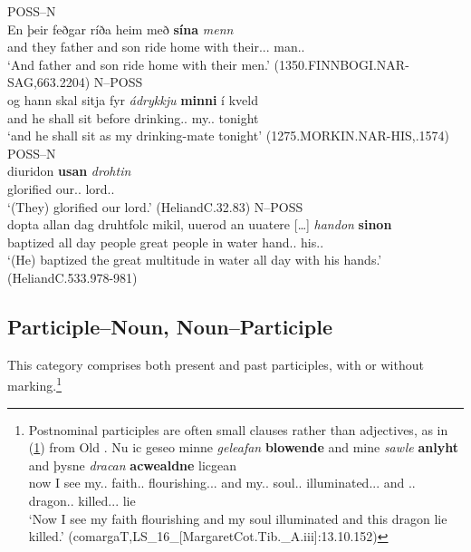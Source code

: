\documentclass[output=paper,colorlinks,citecolor=brown,draft]{langscibook}
\begin{document}
\ea\label{OIPossN}
\noindent {}
\ea
POSS--N\\
\gll En þeir feðgar ríða heim með \textbf{sína} \textit{menn}\\
	and they {father and son} ride home with their.\REFL.\ACC.\PL{} man.\ACC.\PL{}\\
\glt	‘And father and son ride home with their men.’
(1350.FINNBOGI.NAR-SAG,663.2204)
\ex\label{OINPoss}
N--POSS\\
\gll og hann skal sitja fyr \textit{ádrykkju} \textbf{minni} {í kveld}\\
	and he shall sit before drinking.\DAT.\SG{} my.\DAT.\SG{} tonight\\
\glt `and he shall sit as my drinking-mate tonight’ (1275.MORKIN.NAR-HIS,.1574)
\z
\ex\label{OSPossN}
\noindent {}
\ea POSS--N\\
\gll diuridon \textbf{usan} \textit{drohtin}\\
	glorified our.\ACC.\SG{} lord.\ACC.\SG{}\\
\glt ‘(They) glorified our lord.’ (HeliandC.32.83)
\ex\label{OSNPoss}
N--POSS\\
\gll dopta allan dag druhtfolc mikil, uuerod an uuatere […] \textit{handon} \textbf{sinon}\\
baptized all day people great people in water {} hand.\DAT.\PL{} his.\DAT.\PL{}\\
\glt ‘(He) baptized the great multitude in water all day with his hands.’ (HeliandC.533.978-981)
\z
\z
\pagebreak
\subsection{Participle–Noun, Noun–Participle}\label{ssectPartNNPart}
This category comprises both present and past participles, with or without  marking.\footnote{Postnominal
  participles are often small clauses rather than  adjectives, as in (\ref{smallclause}) from Old .
  \ea\label{smallclause}
  \gll Nu ic geseo minne \textit{geleafan} \textbf{blowende} and mine \textit{sawle} \textbf{anlyht} and þysne \textit{dracan} \textbf{acwealdne} licgean \\
          now I see my.\ACC.\SG{} faith.\ACC.\SG{} flourishing.\ACC.\SG.\STR{} and my.\ACC.\SG{} soul.\ACC.\SG{} illuminated.\ACC.\SG.\STR{} and \DEM.\ACC.\SG{} dragon.\ACC.\SG{} killed.\ACC.\SG.\STR{} lie\\
  \glt ‘Now I see my faith flourishing and my soul illuminated and this dragon lie killed.’ (comargaT,LS\_16\_[MargaretCot.Tib.\_A.iii]:13.10.152)
  \z}
\end{document}
